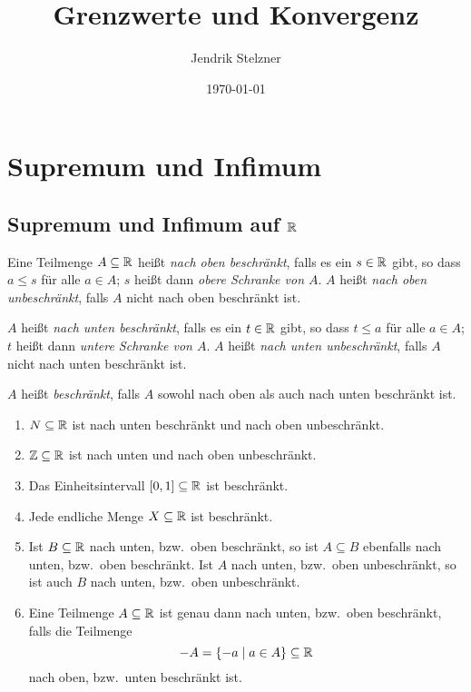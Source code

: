 \documentclass[a4paper,10pt]{article}
\title{Grenzwerte und Konvergenz}
\author{Jendrik Stelzner}
\date{\today}
\begin{document}
\maketitle

\tableofcontents





\section{Supremum und Infimum}



\subsection{Supremum und Infimum auf $\mathbb{R}$}


\begin{defi}
 Eine Teilmenge $A \subseteq \mathbb{R}$ heißt \emph{nach oben beschränkt}, falls es ein $s \in \mathbb{R}$ gibt, so dass $a \leq s$ für alle $a \in A$; $s$ heißt dann \emph{obere Schranke von $A$}. $A$ heißt \emph{nach oben unbeschränkt}, falls $A$ nicht nach oben beschränkt ist.
 
 $A$ heißt \emph{nach unten beschränkt}, falls es ein $t \in \mathbb{R}$ gibt, so dass $t \leq a$ für alle $a \in A$; $t$ heißt dann \emph{untere Schranke von $A$}. $A$ heißt \emph{nach unten unbeschränkt}, falls $A$ nicht nach unten beschränkt ist.
 
 $A$ heißt \emph{beschränkt}, falls $A$ sowohl nach oben als auch nach unten beschränkt ist.
\end{defi}


\begin{bsp}
 \begin{enumerate}
  \item
   $N \subseteq \mathbb{R}$ ist nach unten beschränkt und nach oben unbeschränkt.
  \item
   $\mathbb{Z} \subseteq \mathbb{R}$ ist nach unten und nach oben unbeschränkt.
  \item
   Das Einheitsintervall $[0,1] \subseteq \mathbb{R}$ ist beschränkt.
  \item
   Jede endliche Menge $X \subseteq \mathbb{R}$ ist beschränkt.
  \item
   Ist $B \subseteq \mathbb{R}$ nach unten, bzw.\ oben beschränkt, so ist $A \subseteq B$ ebenfalls nach unten, bzw.\ oben beschränkt. Ist $A$ nach unten, bzw.\ oben unbeschränkt, so ist auch $B$ nach unten, bzw.\ oben unbeschränkt.
  \item
   Eine Teilmenge $A \subseteq \mathbb{R}$ ist genau dann nach unten, bzw.\ oben beschränkt, falls die Teilmenge
   \[
    -A = \{-a \mid a \in A\} \subseteq \mathbb{R}
   \]
   nach oben, bzw.\ unten beschränkt ist.
 \end{enumerate}
\end{bsp}
\end{document}
